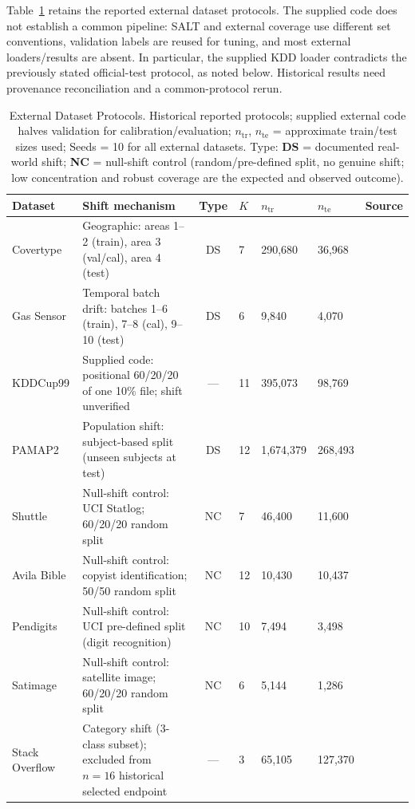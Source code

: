 \documentclass[accepted]{uai2026} %
\begin{document}
Table~\ref{tab:external_datasets} retains the reported external dataset protocols. The supplied code does not establish a common pipeline: SALT and external coverage use different set conventions, validation labels are reused for tuning, and most external loaders/results are absent. In particular, the supplied KDD loader contradicts the previously stated official-test protocol, as noted below. Historical results need provenance reconciliation and a common-protocol rerun.

\begin{table}[htbp]
\centering
\caption{External Dataset Protocols. Historical reported protocols; supplied external code halves validation for calibration/evaluation; $n_\text{tr}$, $n_\text{te}$ = approximate train/test sizes used; Seeds = 10 for all external datasets. Type: \textbf{DS} = documented real-world shift; \textbf{NC} = null-shift control (random/pre-defined split, no genuine shift; low concentration and robust coverage are the expected and observed outcome).}\label{tab:external_datasets}
\small
\begin{tabular}{@{}lp{4.8cm}clllc@{}}
\toprule
Dataset & Shift mechanism & Type & $K$ & $n_\text{tr}$ & $n_\text{te}$ & Source \\
\midrule
Covertype       & Geographic: areas 1--2 (train), area 3 (val/cal), area 4 (test) & DS & 7 & 290,680 & 36,968 & \citep{dua2017uci} \\
Gas Sensor      & Temporal batch drift: batches 1--6 (train), 7--8 (cal), 9--10 (test) & DS & 6 & 9,840 & 4,070 & \citep{dua2017uci} \\
KDDCup99        & Supplied code: positional 60/20/20 of one 10\% file; shift unverified & --- & 11 & 395,073 & 98,769 & \citep{dua2017uci} \\
PAMAP2          & Population shift: subject-based split (unseen subjects at test) & DS & 12 & 1,674,379 & 268,493 & \citep{dua2017uci} \\
Shuttle         & Null-shift control: UCI Statlog; 60/20/20 random split & NC & 7 & 46,400 & 11,600 & \citep{dua2017uci} \\
Avila Bible     & Null-shift control: copyist identification; 50/50 random split & NC & 12 & 10,430 & 10,437 & \citep{dua2017uci} \\
Pendigits       & Null-shift control: UCI pre-defined split (digit recognition) & NC & 10 & 7,494 & 3,498 & \citep{dua2017uci} \\
Satimage        & Null-shift control: satellite image; 60/20/20 random split & NC & 6 & 5,144 & 1,286 & \citep{dua2017uci} \\
Stack Overflow  & Category shift (3-class subset); excluded from $n=16$ historical selected endpoint & --- & 3 & 65,105 & 127,370 & \citep{dua2017uci} \\
\bottomrule
\end{tabular}



\end{table}
\end{document}

